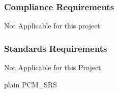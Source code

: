 \documentclass[12pt]{article}
\newcounter{goalnum} %
\begin{document}
\subsubsection*{Compliance Requirements}
Not Applicable for this project
\subsubsection*{Standards Requirements}
Not Applicable for this Project






 {plain}
 {PCM_SRS}
\end{document}
